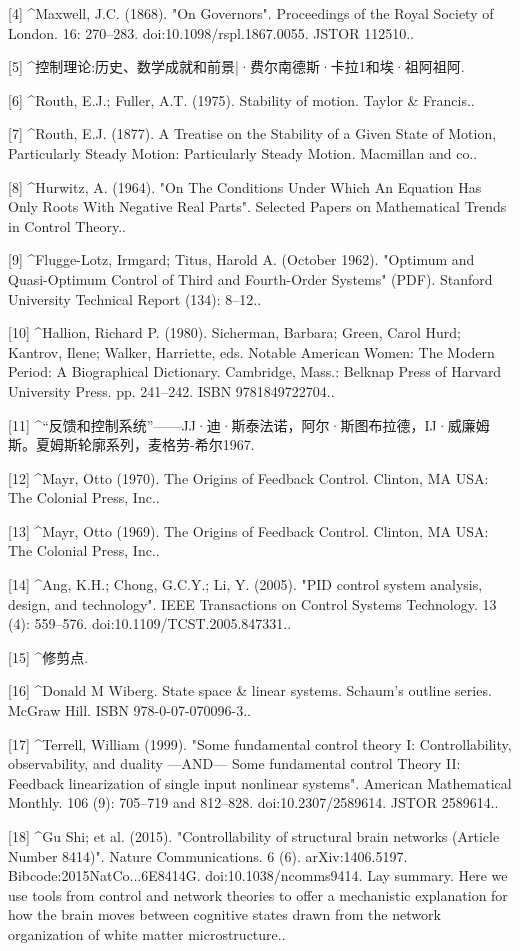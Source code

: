 [4]
^Maxwell, J.C. (1868). "On Governors". Proceedings of the Royal Society of London. 16: 270–283. doi:10.1098/rspl.1867.0055. JSTOR 112510..

[5]
^控制理论:历史、数学成就和前景|·费尔南德斯·卡拉1和埃·祖阿祖阿.

[6]
^Routh, E.J.; Fuller, A.T. (1975). Stability of motion. Taylor & Francis..

[7]
^Routh, E.J. (1877). A Treatise on the Stability of a Given State of Motion, Particularly Steady Motion: Particularly Steady Motion. Macmillan and co..

[8]
^Hurwitz, A. (1964). "On The Conditions Under Which An Equation Has Only Roots With Negative Real Parts". Selected Papers on Mathematical Trends in Control Theory..

[9]
^Flugge-Lotz, Irmgard; Titus, Harold A. (October 1962). "Optimum and Quasi-Optimum Control of Third and Fourth-Order Systems" (PDF). Stanford University Technical Report (134): 8–12..

[10]
^Hallion, Richard P. (1980). Sicherman, Barbara; Green, Carol Hurd; Kantrov, Ilene; Walker, Harriette, eds. Notable American Women: The Modern Period: A Biographical Dictionary. Cambridge, Mass.: Belknap Press of Harvard University Press. pp. 241–242. ISBN 9781849722704..

[11]
^“反馈和控制系统”——JJ·迪·斯泰法诺，阿尔·斯图布拉德，IJ·威廉姆斯。夏姆斯轮廓系列，麦格劳-希尔1967.

[12]
^Mayr, Otto (1970). The Origins of Feedback Control. Clinton, MA USA: The Colonial Press, Inc..

[13]
^Mayr, Otto (1969). The Origins of Feedback Control. Clinton, MA USA: The Colonial Press, Inc..

[14]
^Ang, K.H.; Chong, G.C.Y.; Li, Y. (2005). "PID control system analysis, design, and technology". IEEE Transactions on Control Systems Technology. 13 (4): 559–576. doi:10.1109/TCST.2005.847331..

[15]
^修剪点.

[16]
^Donald M Wiberg. State space & linear systems. Schaum's outline series. McGraw Hill. ISBN 978-0-07-070096-3..

[17]
^Terrell, William (1999). "Some fundamental control theory I: Controllability, observability, and duality —AND— Some fundamental control Theory II: Feedback linearization of single input nonlinear systems". American Mathematical Monthly. 106 (9): 705–719 and 812–828. doi:10.2307/2589614. JSTOR 2589614..

[18]
^Gu Shi; et al. (2015). "Controllability of structural brain networks (Article Number 8414)". Nature Communications. 6 (6). arXiv:1406.5197. Bibcode:2015NatCo...6E8414G. doi:10.1038/ncomms9414. Lay summary. Here we use tools from control and network theories to offer a mechanistic explanation for how the brain moves between cognitive states drawn from the network organization of white matter microstructure..

